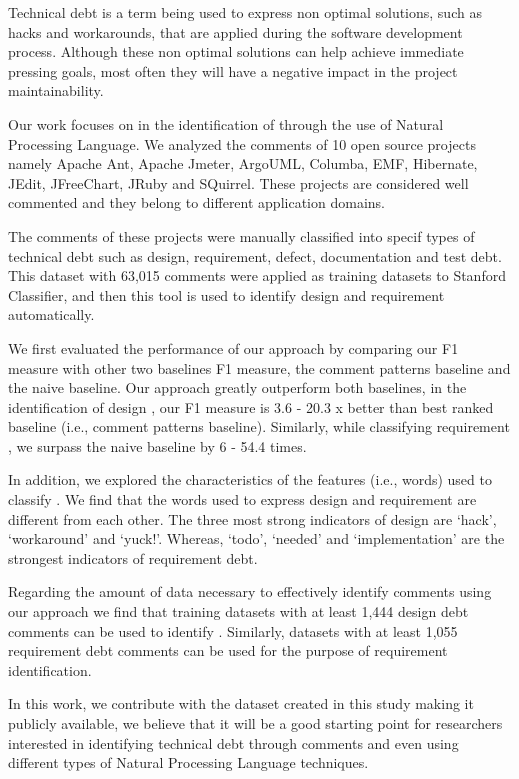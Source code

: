 Technical debt is a term being used to express non optimal solutions, such as hacks and workarounds, that are applied during the software development process. Although these non optimal solutions can help achieve immediate pressing goals, most often they will have a negative impact in the project maintainability. 

Our work focuses on in the identification of \SATD through the use of Natural Processing Language. We analyzed the comments of 10 open source projects namely Apache Ant, Apache Jmeter, ArgoUML, Columba, EMF, Hibernate, JEdit, JFreeChart, JRuby and SQuirrel. These projects are considered well commented and they belong to different application domains.

The comments of these projects were manually classified into specif types of technical debt such as design, requirement, defect, documentation and test debt. This dataset with 63,015 comments were applied as training datasets to Stanford Classifier, and then this tool is used to identify  design and requirement \SATD automatically.

We first evaluated the performance of our approach by comparing our F1 measure with other two baselines F1 measure, the comment patterns baseline and the naive baseline. Our approach greatly outperform both baselines, in the identification of design \SATD, our F1 measure is 3.6 - 20.3 x better than best ranked baseline (i.e., comment patterns baseline). Similarly, while classifying requirement \SATD, we surpass the naive baseline by 6 - 54.4 times.

In addition, we explored the characteristics of the features (i.e., words) used to classify \SATD. We find that the words used to express design and requirement \SATD are different from each other. The three most strong indicators of design \SATD are `hack', `workaround' and `yuck!'. Whereas, `todo', `needed' and `implementation' are the strongest indicators of requirement debt.
 
Regarding the amount of data necessary to effectively identify \SATD comments using our approach we find that training datasets with at least 1,444 design debt comments can be used to identify \SATD. Similarly, datasets with at least 1,055 requirement debt comments can be used for the purpose of requirement \SATD identification. 

In this work, we contribute with the dataset created in this study making it publicly available, we believe that it will be a good starting point for researchers interested in identifying technical debt through comments and even using different types of Natural Processing Language techniques. 

